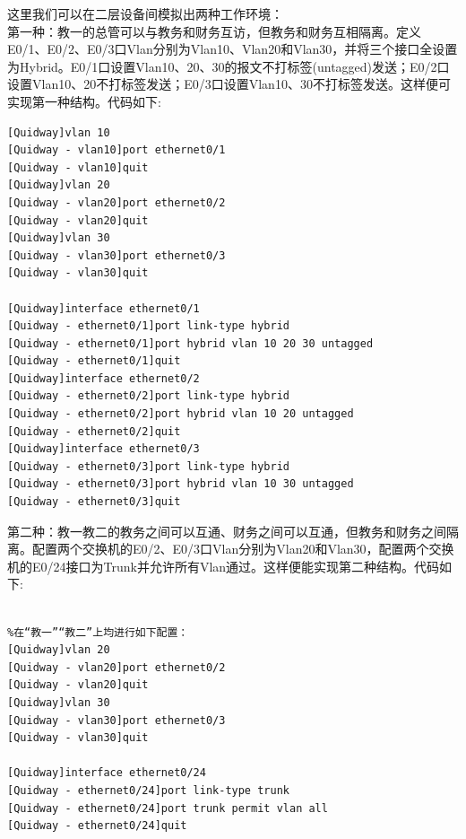 \indent	这里我们可以在二层设备间模拟出两种工作环境：\\
\indent 第一种：教一的总管可以与教务和财务互访，但教务和财务互相隔离。定义E0/1、E0/2、E0/3口Vlan分别为Vlan10、Vlan20和Vlan30，并将三个接口全设置为Hybrid。E0/1口设置Vlan10、20、30的报文不打标签(untagged)发送；E0/2口设置Vlan10、20不打标签发送；E0/3口设置Vlan10、30不打标签发送。这样便可实现第一种结构。代码如下:\\
\begin{lstlisting}
[Quidway]vlan 10
[Quidway - vlan10]port ethernet0/1
[Quidway - vlan10]quit
[Quidway]vlan 20
[Quidway - vlan20]port ethernet0/2
[Quidway - vlan20]quit
[Quidway]vlan 30
[Quidway - vlan30]port ethernet0/3
[Quidway - vlan30]quit

[Quidway]interface ethernet0/1
[Quidway - ethernet0/1]port link-type hybrid
[Quidway - ethernet0/1]port hybrid vlan 10 20 30 untagged
[Quidway - ethernet0/1]quit
[Quidway]interface ethernet0/2
[Quidway - ethernet0/2]port link-type hybrid
[Quidway - ethernet0/2]port hybrid vlan 10 20 untagged
[Quidway - ethernet0/2]quit
[Quidway]interface ethernet0/3
[Quidway - ethernet0/3]port link-type hybrid
[Quidway - ethernet0/3]port hybrid vlan 10 30 untagged
[Quidway - ethernet0/3]quit
\end{lstlisting}

\indent 第二种：教一教二的教务之间可以互通、财务之间可以互通，但教务和财务之间隔离。配置两个交换机的E0/2、E0/3口Vlan分别为Vlan20和Vlan30，配置两个交换机的E0/24接口为Trunk并允许所有Vlan通过。这样便能实现第二种结构。代码如下:\\
\begin{lstlisting}

%在“教一”“教二”上均进行如下配置：
[Quidway]vlan 20
[Quidway - vlan20]port ethernet0/2
[Quidway - vlan20]quit
[Quidway]vlan 30
[Quidway - vlan30]port ethernet0/3
[Quidway - vlan30]quit

[Quidway]interface ethernet0/24
[Quidway - ethernet0/24]port link-type trunk
[Quidway - ethernet0/24]port trunk permit vlan all
[Quidway - ethernet0/24]quit



\end{lstlisting}


	
